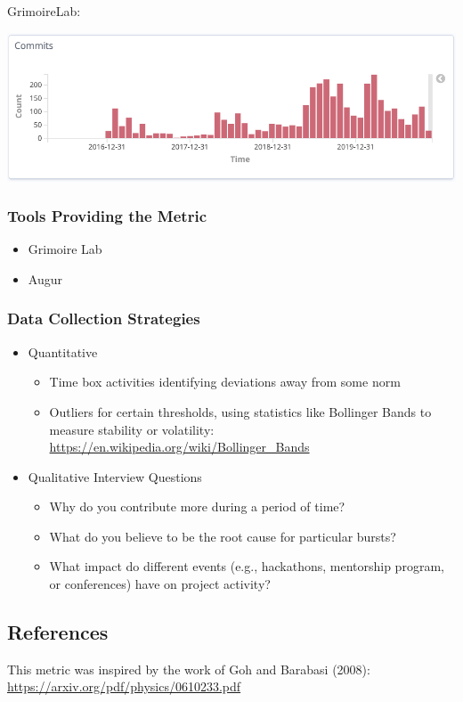 GrimoireLab:

\includegraphics{images/burstiness_gl.png}

\hypertarget{tools-providing-the-metric}{%
\subsubsection{Tools Providing the
Metric}\label{tools-providing-the-metric}}

\begin{itemize}
\tightlist
\item
  Grimoire Lab
\item
  Augur
\end{itemize}

\hypertarget{data-collection-strategies}{%
\subsubsection{Data Collection
Strategies}\label{data-collection-strategies}}

\begin{itemize}
\item
  Quantitative

  \begin{itemize}
  \tightlist
  \item
    Time box activities identifying deviations away from some norm
  \item
    Outliers for certain thresholds, using statistics like Bollinger
    Bands to measure stability or volatility:
    \url{https://en.wikipedia.org/wiki/Bollinger_Bands}
  \end{itemize}
\item
  Qualitative Interview Questions

  \begin{itemize}
  \tightlist
  \item
    Why do you contribute more during a period of time?
  \item
    What do you believe to be the root cause for particular bursts?
  \item
    What impact do different events (e.g., hackathons, mentorship
    program, or conferences) have on project activity?
  \end{itemize}
\end{itemize}

\hypertarget{references}{%
\subsection{References}\label{references}}

This metric was inspired by the work of Goh and Barabasi (2008):
\url{https://arxiv.org/pdf/physics/0610233.pdf}
